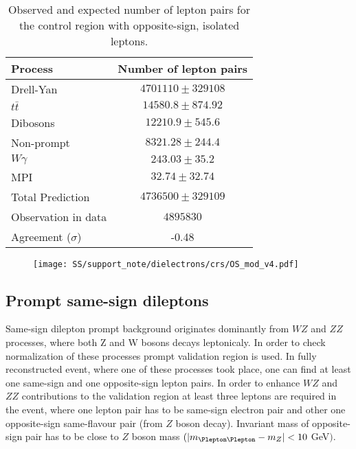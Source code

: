 \begin{table}[htbp]
\caption{Observed and expected number of lepton pairs for the control region with opposite-sign, isolated leptons.} %
\begin{center}
\begin{tabular}{l|c}

Process & Number of lepton pairs \\\hline\hline
        Drell-Yan	& $ 4701110 \pm 329108 $	\\[+0.05in]
	$t\bar{t}$	& $ 14580.8 \pm 874.92 $	\\[+0.05in]
	Dibosons	& $ 12210.9 \pm 545.6 $	\\[+0.05in]
	Non-prompt	& $ 8321.28 \pm 244.4 $	\\[+0.05in]
	$W\gamma$	& $ 243.03 \pm 35.2 $	\\[+0.05in]
	MPI	& $ 32.74 \pm 32.74 $	\\[+0.05in]
	\hline
	Total Prediction	& $ 4736500 \pm 329109 $	\\[+0.05in]
	\hline
	Observation in data	& $ 4895830 $	\\[+0.05in]
	\hline
	Agreement ($\sigma$) & -0.48 \\[+0.05in]

\hline  
\end{tabular}
\end{center}
\label{tab:dilep_isoOS}
\end{table}

\begin{figure}[h]
\begin{center}
\texttt{[image: SS/support\_note/dielectrons/crs/OS\_mod\_v4.pdf]}
\caption{\toDo}
\label{fig:OS_CR}
\end{center}
\end{figure} 



\subsection{Prompt same-sign dileptons}

Same-sign dilepton prompt background originates dominantly from $WZ$ and $ZZ$ processes, where both Z and W bosons decays leptonicaly.
In order to check normalization of these processes prompt validation region is used.
In fully reconstructed event, where one of these processes took place, one can find at least one same-sign and one opposite-sign lepton pairs.
In order to enhance $WZ$ and $ZZ$ contributions to the validation region at least three leptons are required in the event, where one lepton pair
has to be same-sign electron pair and other one opposite-sign same-flavour pair (from $Z$ boson decay). 
Invariant mass of opposite-sign pair has to be close to $Z$ boson mass $(|m_{\Plepton\Plepton} - m_{Z}| < 10$ GeV$)$.

